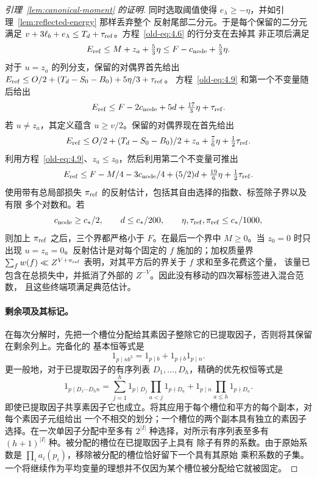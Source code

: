 \begin{proof}[引理~\ref{lem:canonical-moment} 的证明]
同时选取阈值使得 \(e_\lambda\ge-\eta\)，并如引理~\ref{lem:reflected-energy} 那样丢弃整个
反射尾部二分元。于是每个保留的二分元满足
\(v+3\ell_b+e_\lambda\le T_d+\tau_{\rm ref}\)。方程~\eqref{old-eq:4.6} 的行分支在去掉其
非正项后满足
\[
 E_{\rm ref}\le M+z_a+\tfrac53\eta
       \le F-c_{\rm node}+\tfrac53\eta.
\]
对于 \(u=z_a\) 的列分支，保留的对偶界首先给出
\(E_{\rm ref}\le O/2+(T_d-S_0-B_0)+5\eta/3+\tau_{\rm ref}\)。
方程~\eqref{old-eq:4.9} 和第一个不变量随后给出
\begin{equation}\label{old-eq:4.10}
 E_{\rm ref}\le F-2c_{\rm node}+5d+\tfrac{17}{3}\eta+\tau_{\rm ref}.
\end{equation}
若 \(u\ne z_a\)，其定义蕴含 \(u\ge v/2\)。保留的对偶界现在首先给出
\[
 E_{\rm ref}\le O/2+(T_d-S_0-B_0)/2+z_a
                    +\tfrac76\eta+\tfrac12\tau_{\rm ref}.
\]
利用方程~\eqref{old-eq:4.9}、\(z_a\le z_0\)，然后利用第二个不变量可推出
\begin{equation}\label{old-eq:4.11}
 E_{\rm ref}\le F-M/4-3c_{\rm node}/4+(5/2)d
                    +\tfrac{19}{6}\eta+\tfrac12\tau_{\rm ref}.
\end{equation}
使用带有总局部损失 \(\pi_{\rm ref}\) 的反射估计，包括其自由选择的指数、标签除子界以及有限
多个对数和。若
\[
 c_{\rm node}\ge c_*/2,\qquad
 d\le c_*/200,\qquad \eta,\tau_{\rm ref},\pi_{\rm ref}\le c_*/1000,
\]
则加上 \(\pi_{\rm ref}\) 之后，三个界都严格小于 \(F\)。在最后一个界中 \(M\ge0\)。当
\(z_0=0\) 时只出现 \(u=z_a=0\)。反射估计是对每个固定的 \(f\) 施加的；加权质量界
\(\sum_f w(f)\ll Z^{V+\pi_{\rm ref}}\) 表明，对其平方后的界关于 \(f\) 求和至多花费这个量，
该量已包含在总损失中，并抵消了外部的 \(Z^{-V}\)。因此没有移动的四次幂标签进入混合范数，
且这些终端项满足典范估计。

\paragraph{剩余项及其标记。}
在每次分解时，先把一个槽位分配给其素因子整除它的已提取因子，否则将其保留在剩余列上。完备化的
基本恒等式是
\begin{equation}\label{old-eq:4.12}
 1_{p\mid nb^3}=1_{p\mid b}+1_{p\nmid b}1_{p\mid n}.
\end{equation}
更一般地，对于已提取因子的有序列表 \(D_1,\ldots,D_h\)，精确的优先权恒等式是
\begin{equation}\label{eq:inverse-slot-priority}
 1_{p\mid D_1\cdots D_hn}
 =\sum_{j=1}^h1_{p\mid D_j}\prod_{a<j}1_{p\nmid D_a}
   +1_{p\mid n}\prod_{a\le h}1_{p\nmid D_a}.
\end{equation}
即使已提取因子共享素因子它也成立。将其应用于每个槽位和平方的每个副本，对每个素因子元组给出
一个不相交的划分；一个槽位的两个副本具有独立的素因子选择。在一次单因子分配中至多有
\(2^{|I|}\) 种选择，对所示有序列表至多有 \((h+1)^{|I|}\) 种。被分配的槽位在已提取因子上具有
除子有界的系数。由于原始系数是 \(\prod_i a_i(p_i)\)，移除被分配的槽位恰好留下一个具有其原始
乘积系数的子集。一个将继续作为平均变量的理想并不仅因为某个槽位被分配给它就被固定。


\end{proof}
